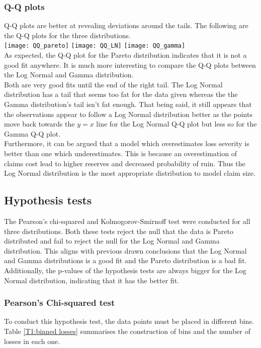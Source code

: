 \documentclass[titlepage]{article}
\begin{document}
	\subsubsection{Q-Q plots}
	Q-Q plots are better at revealing deviations around the tails. The following are the Q-Q plots for the three distributions.\\
			\texttt{[image: QQ\_pareto]}
	\texttt{[image: QQ\_LN]}
	\texttt{[image: QQ\_gamma]}\\
	As expected, the Q-Q plot for the Pareto distribution indicates that it is not a good fit anywhere. It is much more interesting to compare the Q-Q plots between the Log Normal and Gamma distribution.\\
	Both are very good fits until the end of the right tail. The Log Normal distribution has a tail that seems too fat for the data given whereas the the Gamma distribution's tail isn't fat enough. That being said, it still appears that the observations appear to follow a Log Normal distribution better as the points move back towards the $y=x$ line for the Log Normal Q-Q plot but less so for the Gamma Q-Q plot.\\
	Furthermore, it can be argued that a model which overestimates loss severity is better than one which underestimates. This is because an overestimation of claims cost lead to higher reserves and decreased probability of ruin. Thus the Log Normal distribution is the most appropriate distribution to model claim size.
	\subsection{Hypothesis tests}
	The Pearson's chi-squared and Kolmogorov-Smirnoff test were conducted for all three distributions. Both these tests reject the null that the data is Pareto distributed and fail to reject the null for the Log Normal and Gamma distribution. This aligns with previous drawn conclusions that the Log Normal and Gamma distributions is a good fit and the Pareto distribution is a bad fit. \\
	Additionally, the p-values of the hypothesis tests are always bigger for the Log Normal distribution, indicating that it has the better fit.
	
	\subsubsection{Pearson's Chi-squared test}
	To conduct this hypothesis test, the data points must be placed in different bins. Table \ref{T1:binned losses} summarises the construction of bins and the number of losses in each one.
	
\end{document}
